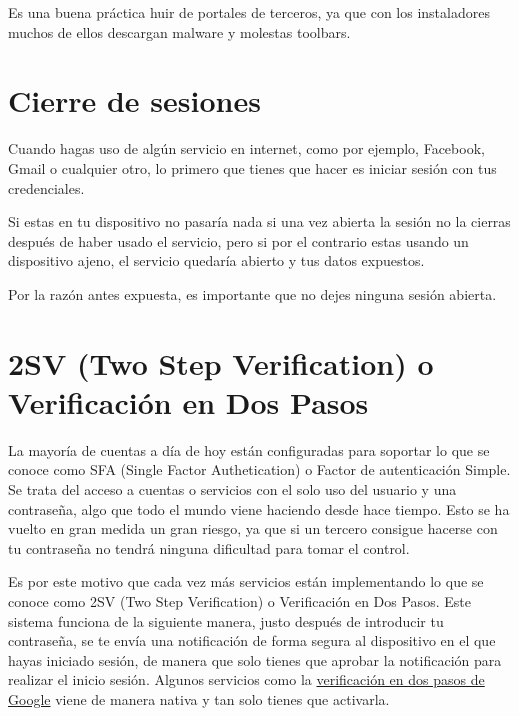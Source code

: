 \documentclass[
  a4paper,
  openany]{book}
\begin{document}
Es una buena práctica huir de portales de terceros, ya que con los instaladores muchos de ellos descargan malware y molestas toolbars.

\hypertarget{cierre-de-sesiones}{%
\section{Cierre de sesiones}\label{cierre-de-sesiones}}

Cuando hagas uso de algún servicio en internet, como por ejemplo, Facebook, Gmail o cualquier otro, lo primero que tienes que hacer es iniciar sesión con tus credenciales.

Si estas en tu dispositivo no pasaría nada si una vez abierta la sesión no la cierras después de haber usado el servicio, pero si por el contrario estas usando un dispositivo ajeno, el servicio quedaría abierto y tus datos expuestos.

Por la razón antes expuesta, es importante que no dejes ninguna sesión abierta.

\hypertarget{sv-two-step-verification-o-verificaciuxf3n-en-dos-pasos}{%
\section{2SV (Two Step Verification) o Verificación en Dos Pasos}\label{sv-two-step-verification-o-verificaciuxf3n-en-dos-pasos}}

La mayoría de cuentas a día de hoy están configuradas para soportar lo que se conoce como SFA (Single Factor Authetication) o Factor de autenticación Simple. Se trata del acceso a cuentas o servicios con el solo uso del usuario y una contraseña, algo que todo el mundo viene haciendo desde hace tiempo. Esto se ha vuelto en gran medida un gran riesgo, ya que si un tercero consigue hacerse con tu contraseña no tendrá ninguna dificultad para tomar el control.

Es por este motivo que cada vez más servicios están implementando lo que se conoce como 2SV (Two Step Verification) o Verificación en Dos Pasos. Este sistema funciona de la siguiente manera, justo después de introducir tu contraseña, se te envía una notificación de forma segura al dispositivo en el que hayas iniciado sesión, de manera que solo tienes que aprobar la notificación para realizar el inicio sesión. Algunos servicios como la \href{https://support.google.com/accounts/answer/185839?co=GENIE.Platform\%3DDesktop\&hl=es}{verificación en dos pasos de Google} viene de manera nativa y tan solo tienes que activarla.
\end{document}
